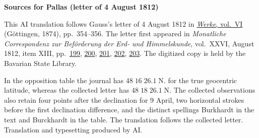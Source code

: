 \clearpage\thispagestyle{empty}
\begin{center}\textbf{Sources for Pallas (letter of 4 August 1812)}\end{center}
\noindent This AI translation follows Gauss’s letter of 4 August 1812 in \href{https://gdz.sub.uni-goettingen.de/id/PPN236007467}{\textit{Werke}, vol.~VI} (Göttingen, 1874), pp.~354--356. The letter first appeared in \textit{Monatliche Correspondenz zur Beförderung der Erd- und Himmelskunde}, vol.~XXVI, August 1812, item XIII, pp.~\href{https://api.digitale-sammlungen.de/iiif/image/v2/bsb10538615_00207/full/1600,/0/default.jpg}{199}, \href{https://api.digitale-sammlungen.de/iiif/image/v2/bsb10538615_00208/full/1600,/0/default.jpg}{200}, \href{https://api.digitale-sammlungen.de/iiif/image/v2/bsb10538615_00209/full/1600,/0/default.jpg}{201}, \href{https://api.digitale-sammlungen.de/iiif/image/v2/bsb10538615_00210/full/1600,/0/default.jpg}{202}, \href{https://api.digitale-sammlungen.de/iiif/image/v2/bsb10538615_00211/full/1600,/0/default.jpg}{203}. The digitized copy is held by the Bavarian State Library.
\par\smallskip\noindent In the opposition table the journal has $48\;16\;26.1\;\mathrm{N}.$ for the true geocentric latitude, whereas the collected letter has $48\;18\;26.1\;\mathrm{N}.$ The collected observations also retain four points after the declination for 9 April, two horizontal strokes before the first declination difference, and the distinct spellings Burkhardt in the text and Burckhardt in the table. The translation follows the collected letter. Translation and typesetting produced by AI.
\clearpage
